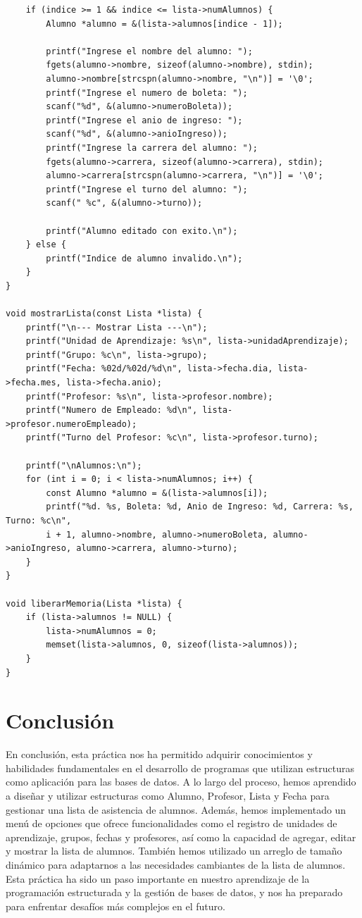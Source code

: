 \documentclass{article}
\begin{document}
\begin{lstlisting}
	if (indice >= 1 && indice <= lista->numAlumnos) {
		Alumno *alumno = &(lista->alumnos[indice - 1]);
		
		printf("Ingrese el nombre del alumno: ");
		fgets(alumno->nombre, sizeof(alumno->nombre), stdin);
		alumno->nombre[strcspn(alumno->nombre, "\n")] = '\0';
		printf("Ingrese el numero de boleta: ");
		scanf("%d", &(alumno->numeroBoleta));
		printf("Ingrese el anio de ingreso: ");
		scanf("%d", &(alumno->anioIngreso));
		printf("Ingrese la carrera del alumno: ");
		fgets(alumno->carrera, sizeof(alumno->carrera), stdin);
		alumno->carrera[strcspn(alumno->carrera, "\n")] = '\0';
		printf("Ingrese el turno del alumno: ");
		scanf(" %c", &(alumno->turno));
		
		printf("Alumno editado con exito.\n");
	} else {
		printf("Indice de alumno invalido.\n");
	}
}

void mostrarLista(const Lista *lista) {
	printf("\n--- Mostrar Lista ---\n");
	printf("Unidad de Aprendizaje: %s\n", lista->unidadAprendizaje);
	printf("Grupo: %c\n", lista->grupo);
	printf("Fecha: %02d/%02d/%d\n", lista->fecha.dia, lista->fecha.mes, lista->fecha.anio);
	printf("Profesor: %s\n", lista->profesor.nombre);
	printf("Numero de Empleado: %d\n", lista->profesor.numeroEmpleado);
	printf("Turno del Profesor: %c\n", lista->profesor.turno);
	
	printf("\nAlumnos:\n");
	for (int i = 0; i < lista->numAlumnos; i++) {
		const Alumno *alumno = &(lista->alumnos[i]);
		printf("%d. %s, Boleta: %d, Anio de Ingreso: %d, Carrera: %s, Turno: %c\n",
		i + 1, alumno->nombre, alumno->numeroBoleta, alumno->anioIngreso, alumno->carrera, alumno->turno);
	}
}

void liberarMemoria(Lista *lista) {
	if (lista->alumnos != NULL) {
		lista->numAlumnos = 0;
		memset(lista->alumnos, 0, sizeof(lista->alumnos));
	}
}
	\end{lstlisting}
	
	\newpage
	
	\section{Conclusión}
	
	En conclusión, esta práctica nos ha permitido adquirir conocimientos y habilidades fundamentales en el desarrollo de programas que utilizan estructuras como aplicación para las bases de datos. A lo largo del proceso, hemos aprendido a diseñar y utilizar estructuras como Alumno, Profesor, Lista y Fecha para gestionar una lista de asistencia de alumnos. Además, hemos implementado un menú de opciones que ofrece funcionalidades como el registro de unidades de aprendizaje, grupos, fechas y profesores, así como la capacidad de agregar, editar y mostrar la lista de alumnos. También hemos utilizado un arreglo de tamaño dinámico para adaptarnos a las necesidades cambiantes de la lista de alumnos. Esta práctica ha sido un paso importante en nuestro aprendizaje de la programación estructurada y la gestión de bases de datos, y nos ha preparado para enfrentar desafíos más complejos en el futuro.
	
\end{document}
